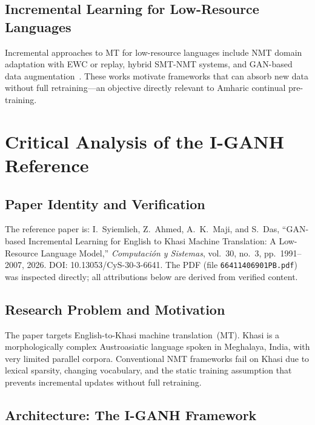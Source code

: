 \documentclass[11pt,a4paper]{article}
\begin{document}
\subsection{Incremental Learning for Low-Resource Languages}

Incremental approaches to MT for low-resource languages include NMT
domain adaptation with EWC or replay, hybrid SMT-NMT systems, and
GAN-based data augmentation~\cite{Huang2023,Hujon2023,Kalimuthu2019,Syiemlieh2026}.
These works motivate frameworks that can absorb new data without full
retraining---an objective directly relevant to Amharic continual
pre-training.

\section{Critical Analysis of the I-GANH Reference}
\label{sec:refanalysis}

\subsection{Paper Identity and Verification}

The reference paper is: I.~Syiemlieh, Z.~Ahmed, A.~K.~Maji, and
S.~Das, ``GAN-based Incremental Learning for English to Khasi Machine
Translation: A Low-Resource Language Model,'' \emph{Computaci\'on y
Sistemas}, vol.~30, no.~3, pp.~1991--2007, 2026.  DOI:
10.13053/CyS-30-3-6641.  The PDF (file \texttt{66411406901PB.pdf})
was inspected directly; all attributions below are derived from
verified content.

\subsection{Research Problem and Motivation}

The paper targets English-to-Khasi machine translation~(MT).  Khasi is
a morphologically complex Austroasiatic language spoken in Meghalaya,
India, with very limited parallel corpora.  Conventional NMT frameworks
fail on Khasi due to lexical sparsity, changing vocabulary, and the
static training assumption that prevents incremental updates without
full retraining.

\subsection{Architecture: The I-GANH Framework}
\end{document}
